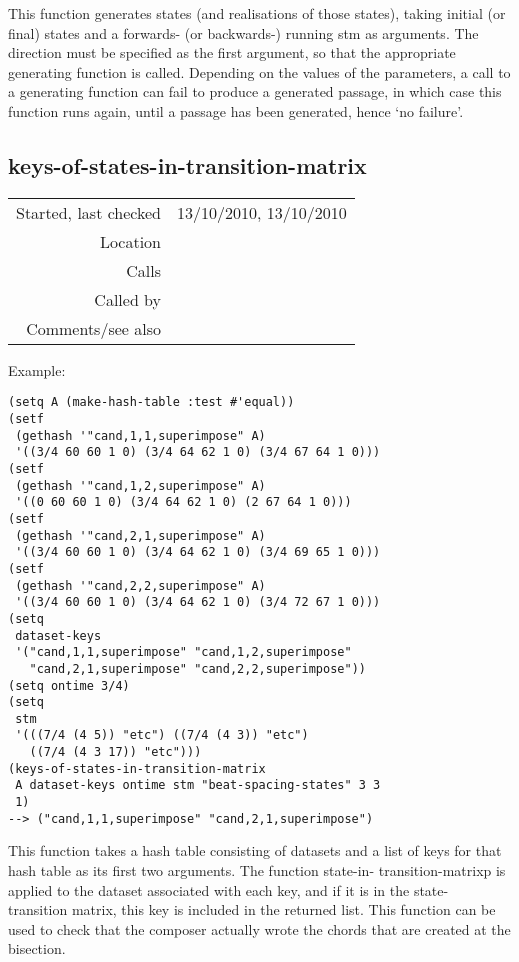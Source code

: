 This function generates states (and realisations of
those states), taking initial (or final) states and
a forwards- (or backwards-) running stm as arguments.
The direction must be specified as the first
argument, so that the appropriate generating function
is called. Depending on the values of the
parameters, a call to a generating function can fail
to produce a generated passage, in which case this
function runs again, until a passage has been
generated, hence `no failure'.


\subsection*{keys-of-states-in-transition-matrix}\label{fun:keys-of-states-in-transition-matrix}

\vspace{0.3cm}
\begin{tabular}{r|p{8cm}}
Started, last checked & 13/10/2010, 13/10/2010 \\
Location & \nameref{sec:generating-beat-MNN-spacing-for-and-back} \\
Calls & \nameref{fun:state-in-transition-matrixp} \\
Called by & \nameref{fun:most-plausible-join} \\
Comments/see also &
\end{tabular}

\vspace{0.5cm}
\noindent Example:
\begin{verbatim}
(setq A (make-hash-table :test #'equal))
(setf
 (gethash '"cand,1,1,superimpose" A)
 '((3/4 60 60 1 0) (3/4 64 62 1 0) (3/4 67 64 1 0)))
(setf
 (gethash '"cand,1,2,superimpose" A)
 '((0 60 60 1 0) (3/4 64 62 1 0) (2 67 64 1 0)))
(setf
 (gethash '"cand,2,1,superimpose" A)
 '((3/4 60 60 1 0) (3/4 64 62 1 0) (3/4 69 65 1 0)))
(setf
 (gethash '"cand,2,2,superimpose" A)
 '((3/4 60 60 1 0) (3/4 64 62 1 0) (3/4 72 67 1 0)))
(setq
 dataset-keys
 '("cand,1,1,superimpose" "cand,1,2,superimpose"
   "cand,2,1,superimpose" "cand,2,2,superimpose"))
(setq ontime 3/4)
(setq
 stm
 '(((7/4 (4 5)) "etc") ((7/4 (4 3)) "etc")
   ((7/4 (4 3 17)) "etc")))
(keys-of-states-in-transition-matrix
 A dataset-keys ontime stm "beat-spacing-states" 3 3
 1)
--> ("cand,1,1,superimpose" "cand,2,1,superimpose")
\end{verbatim}

\noindent This function takes a hash table consisting
of datasets and a list of keys for that hash table as
its first two arguments. The function state-in-
transition-matrixp is applied to the dataset
associated with each key, and if it is in the state-
transition matrix, this key is included in the
returned list. This function can be used to check
that the composer actually wrote the chords that are
created at the bisection.


